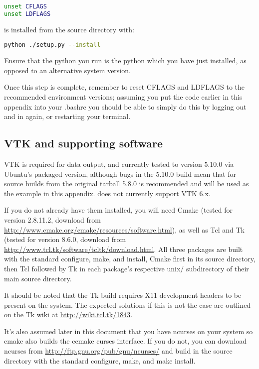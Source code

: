 \begin{lstlisting}[language=bash]
unset CFLAGS
unset LDFLAGS
\end{lstlisting}

is installed from the source directory with:

\begin{lstlisting}[language=bash]
python ./setup.py --install
\end{lstlisting}

Ensure that the python you run is the python which you have just installed, as
opposed to an alternative system version.

Once this step is complete, remember to reset CFLAGS and LDFLAGS to the
recommended environment versions; assuming you put the code earlier in this 
appendix into your .bashrc you should be able to simply do this by logging out
and in again, or restarting your terminal.

\subsection{VTK and supporting software}
\label{sec:required_libraries_vtk}

VTK is required for \fluidity data output, and currently tested to version
5.10.0 via Ubuntu's packaged version, although bugs in the 5.10.0 build mean
that for source builds from the original tarball 5.8.0 is recommended and will
be used as the example in this appendix. \fluidity does not currently support
VTK 6.x.

If you do not already have them installed, you will need Cmake (tested for
version 2.8.11.2, download from
\url{http://www.cmake.org/cmake/resources/software.html}), as well as Tcl and
Tk (tested for version 8.6.0, download from
\url{http://www.tcl.tk/software/tcltk/download.html}. All three packages are
built with the standard configure, make, and install, Cmake first in its source
directory, then Tcl followed by Tk in each package's respective unix/
subdirectory of their main source directory.

It should be noted that the Tk build requires X11 development headers to be
present on the system. The expected solutions if this is not the case are
outlined on the Tk wiki at \url{http://wiki.tcl.tk/1843}.

It's also assumed later in this document that you have ncurses on your system
so cmake also builds the ccmake curses interface. If you do not, you can
download ncurses from \url{http://ftp.gnu.org/pub/gnu/ncurses/} and build in
the source directory with the standard configure, make, and make install.

